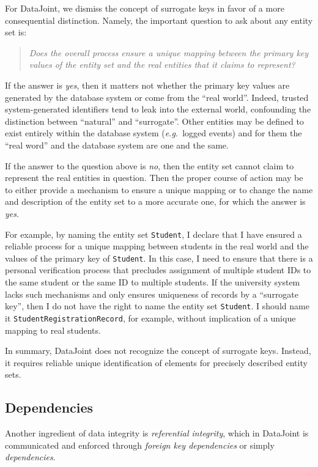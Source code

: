 \documentclass[letter,10pt]{article}
\newcommand{\datajoint}{DataJoint\xspace}
\begin{document}
For \datajoint, we dismiss the concept of surrogate keys in favor of a more consequential distinction.
Namely, the important question to ask about any entity set is:
\begin{quote}
\em
Does the overall process ensure a unique mapping between the primary key values of the entity set and the real entities that it claims to represent?
\end{quote}

If the answer is \emph{yes}, then it matters not whether the primary key values are generated by the database system or come from the ``real world''. 
Indeed, trusted system-generated identifiers tend to leak into the external world, confounding the distinction between ``natural'' and ``surrogate''.
Other entities may be defined to exist entirely within the database system (\emph{e.g.}\ logged events) and for them the ``real word'' and the database system are one and the same.

If the answer to the question above is \emph{no}, then the entity set cannot claim to represent the real entities in question. 
Then the proper course of action may be to either provide a mechanism to ensure a unique mapping or to change the name and description of the entity set to a more accurate one, for which the answer is \emph{yes}. 

For example, by naming the entity set \lstinline$Student$, I declare that I have ensured a reliable process for a unique mapping between students in the real world and the values of the primary key of \lstinline$Student$.
In this case, I need to ensure that there is a personal verification process that precludes assignment of multiple student IDs to the same student or the same ID to multiple students.
If the university system lacks such mechanisms and only ensures uniqueness of records by a ``surrogate key'', then I do not have the right to name the entity set \lstinline$Student$.
I should name it \lstinline$StudentRegistrationRecord$, for example, without implication of a unique mapping to real students.

In summary, \datajoint does not recognize the concept of surrogate keys.  
Instead, it requires reliable unique identification of elements for precisely described entity sets.

\subsection{Dependencies}
Another ingredient of data integrity is \emph{referential integrity}, which in \datajoint is communicated and enforced through \emph{foreign key dependencies} or simply \emph{dependencies}.
\end{document}
